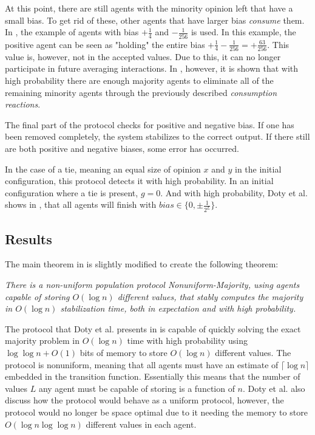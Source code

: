 At this point, there are still agents with the minority opinion left that have a small bias. To get rid of these, other agents that have larger bias \emph{consume} them. In \cite{dotyTimeSpaceOptimal2022}, the example of agents with bias $+ \frac{1}{4}$ and $- \frac{1}{256}$ is used. In this example, the positive agent can be seen as "holding" the entire bias $+ \frac{1}{4} - \frac{1}{256} = + \frac{63}{256}$. This value is, however, not in the accepted values. Due to this, it can no longer participate in future averaging interactions. In \cite{dotyTimeSpaceOptimal2022}, however, it is shown that with high probability there are enough majority agents to eliminate all of the remaining minority agents through the previously described \emph{consumption reactions}.

The final part of the protocol checks for positive and negative bias. If one has been removed completely, the system stabilizes to the correct output. If there still are both positive and negative biases, some error has occurred.

In the case of a tie, meaning an equal size of opinion $x$ and $y$ in the initial configuration, this protocol detects it with high probability. In an initial configuration where a tie is present, $g = 0$. And with high probability, Doty et al. shows in \cite{dotyTimeSpaceOptimal2022}, that all agents will finish with $bias \in \{ 0, \pm \frac{1}{2^L} \}$. 


\subsection{Results} \label{Section4Results}

The main theorem in \cite{dotyTimeSpaceOptimal2022} is slightly modified to create the following theorem: 

 \begin{theorem}
    \textit{
        There is a non-uniform population protocol Nonuniform-Majority, using agents capable of storing $O(\log n)$ different values, that stably computes the majority in $O(\log n)$ stabilization time, both in expectation and with high probability.
    }
 \end{theorem} 

The protocol that Doty et al. presents in \cite{dotyTimeSpaceOptimal2022} is capable of quickly solving the exact majority problem in $O(\log n)$ time with high probability using $\log \log n + O(1)$ bits of memory to store $O(\log n)$ different values. The protocol is nonuniform, meaning that all agents must have an estimate of $\lceil \log n \rceil$ embedded in the transition function. Essentially this means that the number of values $L$ any agent must be capable of storing is a function of $n$. Doty et al. also discuss how the protocol would behave as a uniform protocol, however, the protocol would no longer be space optimal due to it needing the memory to store $O(\log n \log \log n)$ different values in each agent. 

